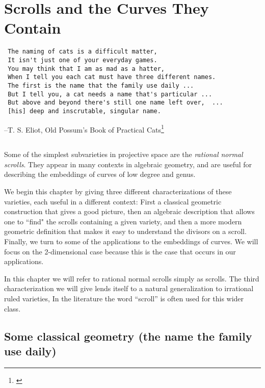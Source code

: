 

\chapter{Scrolls and the Curves They Contain}
\label{ScrollsChapter}


\begin{verbatim}
 The naming of cats is a difficult matter,
 It isn't just one of your everyday games.
 You may think that I am as mad as a hatter,
 When I tell you each cat must have three different names.
 The first is the name that the family use daily ...
 But I tell you, a cat needs a name that's particular ...
 But above and beyond there's still one name left over,  ...
 [his] deep and inscrutable, singular name.
\end{verbatim}
--T. S. Eliot, Old Possum's Book of Practical Cats\footnote{\cite{PracticalCats}}

\section*{}
Some of the simplest subvarieties in projective space are the \emph{rational normal scrolls}. They appear in many contexts in algebraic geometry, and are useful for describing the embeddings of curves of low degree and genus. 

We begin this chapter by giving three different characterizations of these varieties, each useful in a different context: First a classical geometric construction that gives a good picture, then an algebraic description that allows one to ``find" the scrolls containing a given variety, and then a more modern geometric definition that makes it easy to understand the divisors on a scroll. Finally, we turn to some of the applications to the embeddings of curves. We will focus on the 2-dimensional case because this is the case that occurs in our applications.

In this chapter we will refer to rational normal scrolls simply as scrolls. The third characterization we will give lends itself to a natural generalization to  irrational ruled varieties, In the literature the word ``scroll'' is often used for this wider class.

\section{Some classical geometry (the name the family use daily)}\label{daily name}

